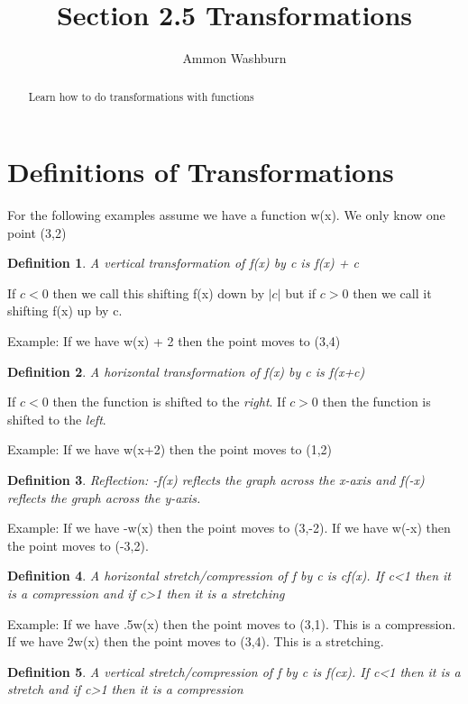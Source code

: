 \documentclass{tufte-handout}
\title{Section 2.5 Transformations}
\author[AW]{Ammon Washburn}
\newtheorem{mydef}{Definition}
\begin{document}
\maketitle

\begin{abstract}
Learn how to do transformations with functions
\end{abstract}

\section{Definitions of Transformations}
For the following examples assume we have a function w(x).  We only know one point (3,2)
\begin{mydef}
A vertical transformation of f(x) by c is f(x) + c
\end{mydef}
If $c<0$ then we call this shifting f(x) down by $|c|$ but if $c>0$ then we call it shifting f(x) up by c.

Example: If we have w(x) + 2 then the point moves to (3,4)
\begin{mydef}
A horizontal transformation of f(x) by c is f(x+c)
\end{mydef}

If $c<0$ then the function is shifted to the \textit{right}.  If $c>0$ then the function is shifted to the \textit{left}.

Example: If we have w(x+2) then the point moves to (1,2)

\begin{mydef}
Reflection: -f(x) reflects the graph across the x-axis and f(-x) reflects the graph across the y-axis.
\end{mydef}

Example: If we have -w(x) then the point moves to (3,-2).  If we have w(-x) then the point moves to (-3,2).

\begin{mydef}
A horizontal stretch/compression of f by c is cf(x). If c<1 then it is a compression and if c>1 then it is a stretching
\end{mydef}

Example: If we have .5w(x) then the point moves to (3,1).  This is a compression.  If we have 2w(x) then the point moves to (3,4).  This is a stretching.

\begin{mydef}
A vertical stretch/compression of f by c is f(cx). If c<1 then it is a stretch and if c>1 then it is a compression
\end{mydef}
\end{document}
